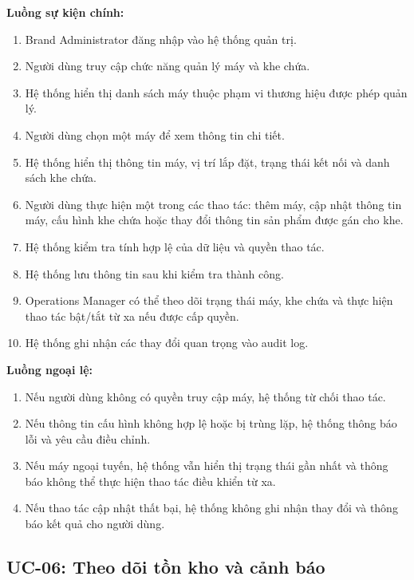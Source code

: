 \textbf{Luồng sự kiện chính:}
\begin{enumerate}
    \item Brand Administrator đăng nhập vào hệ thống quản trị.
    \item Người dùng truy cập chức năng quản lý máy và khe chứa.
    \item Hệ thống hiển thị danh sách máy thuộc phạm vi thương hiệu được phép quản lý.
    \item Người dùng chọn một máy để xem thông tin chi tiết.
    \item Hệ thống hiển thị thông tin máy, vị trí lắp đặt, trạng thái kết nối và danh sách khe chứa.
    \item Người dùng thực hiện một trong các thao tác: thêm máy, cập nhật thông tin máy, cấu hình khe chứa hoặc thay đổi thông tin sản phẩm được gán cho khe.
    \item Hệ thống kiểm tra tính hợp lệ của dữ liệu và quyền thao tác.
    \item Hệ thống lưu thông tin sau khi kiểm tra thành công.
    \item Operations Manager có thể theo dõi trạng thái máy, khe chứa và thực hiện thao tác bật/tắt từ xa nếu được cấp quyền.
    \item Hệ thống ghi nhận các thay đổi quan trọng vào audit log.
\end{enumerate}

\textbf{Luồng ngoại lệ:}
\begin{enumerate}[label=\arabic{enumi}a*.]
    \item Nếu người dùng không có quyền truy cập máy, hệ thống từ chối thao tác.
    \item Nếu thông tin cấu hình không hợp lệ hoặc bị trùng lặp, hệ thống thông báo lỗi và yêu cầu điều chỉnh.
    \item Nếu máy ngoại tuyến, hệ thống vẫn hiển thị trạng thái gần nhất và thông báo không thể thực hiện thao tác điều khiển từ xa.
    \item Nếu thao tác cập nhật thất bại, hệ thống không ghi nhận thay đổi và thông báo kết quả cho người dùng.
\end{enumerate}

\subsection{UC-06: Theo dõi tồn kho và cảnh báo}

